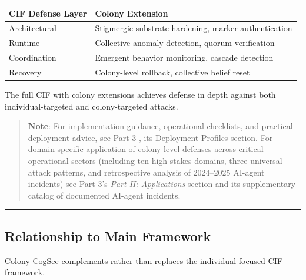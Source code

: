\documentclass[
]{article}
\newcounter{none} %
\begin{document}
{\def\LTcaptype{none} %
\begin{longtable}[]{@{}
  >{\raggedright\arraybackslash}p{}
  >{\raggedright\arraybackslash}p{}@{}}
\toprule\noalign{}
\begin{minipage}[b]{\linewidth}\raggedright
CIF Defense Layer
\end{minipage} & \begin{minipage}[b]{\linewidth}\raggedright
Colony Extension
\end{minipage} \\
\midrule\noalign{}
\endhead
\bottomrule\noalign{}
\endlastfoot
Architectural & Stigmergic substrate hardening, marker authentication \\
Runtime & Collective anomaly detection, quorum verification \\
Coordination & Emergent behavior monitoring, cascade detection \\
Recovery & Colony-level rollback, collective belief reset \\
\end{longtable}
}

The full CIF with colony extensions achieves defense in depth against
both individual-targeted and colony-targeted attacks.

\begin{quote}
\textbf{Note}: For implementation guidance, operational checklists, and
practical deployment advice, see Part 3 \cite{friedman2026cogsec3}, its
Deployment Profiles section. For domain-specific application of
colony-level defenses across critical operational sectors (including ten
high-stakes domains, three universal attack patterns, and retrospective
analysis of 2024--2025 AI-agent incidents) see Part 3's \emph{Part II:
Applications} section and its supplementary catalog of documented
AI-agent incidents.
\end{quote}

\begin{center}\rule{0.5\linewidth}{0.5pt}\end{center}

\subsection{Relationship to Main Framework}\label{sec:relationship-main}

Colony CogSec complements rather than replaces the individual-focused
CIF framework.
\end{document}

